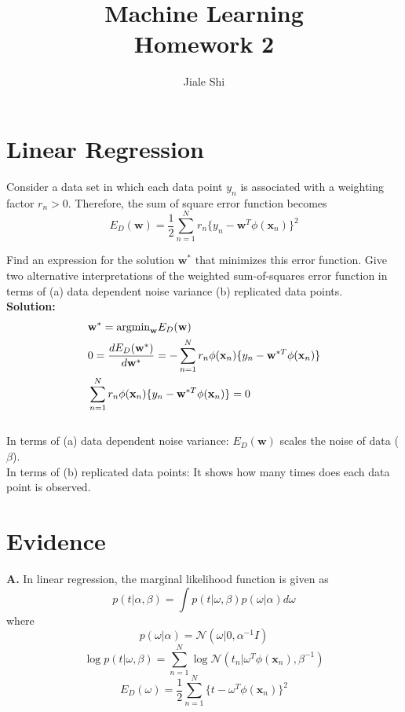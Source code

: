 \documentclass{article}
\title{Machine Learning\\[1em] Homework 2}
\author{Jiale Shi}
\begin{document}
\maketitle

\newpage
\section{Linear Regression}
Consider a data set in which each data point $y_{n}$ is associated with a weighting factor $r_{n}>0$. Therefore, the sum of square error function becomes
\begin{equation}
    E_{D}(\mathbf{w}) = \frac{1}{2} \sum_{n=1}^{N}r_{n}\{y_{n}-\mathbf{w}^{T}\phi(\mathbf{x}_{n})\}^{2}
\end{equation}


Find an expression for the solution $\mathbf{w}^*$ that minimizes this error function. Give two alternative interpretations of the weighted sum-of-squares error function in terms of (a) data dependent noise variance (b) replicated data points.
\\
\textbf{Solution:} \\
\begin{equation}
\begin{aligned}
&  \mathbf{w}^{*}  = {\rm argmin}_{\mathbf{w}}E_{D}(\mathbf{w}) \\
& 0 =  \frac{d E_{D}(\mathbf{w}^{*})}{d \mathbf{w}^{*}}= -\sum_{n=1}^{N}r_{n}\phi(\mathbf{x}_{n})\{y_{n}-\mathbf{w}^{*T}\phi(\mathbf{x}_{n})\} \\
& \sum_{n=1}^{N}r_{n}\phi(\mathbf{x}_{n})\{y_{n}-\mathbf{w}^{*T}\phi(\mathbf{x}_{n})\} = 0
\end{aligned}
\end{equation}
\\
In terms of (a) data dependent noise variance: $E_{D}(\mathbf{w})$ scales the noise of data ($\beta$).
\\
In terms of (b) replicated data points: It shows how many times does each data point is observed.

\newpage
\section{Evidence}
\textbf{A.} In linear regression, the marginal likelihood function is given as 
\begin{equation}
    p(t|\alpha,\beta) = \int p(t|\omega, \beta)p(\omega | \alpha) d\omega
\end{equation}
where
\begin{equation}
    p(\omega | \alpha) = \mathcal{N}(\omega|0,\alpha^{-1} I)
\end{equation}
\begin{equation}
    \log p(t|\omega,\beta) = \sum_{n=1}^{N} \log \mathcal{N}(t_{n}|\omega^{T}\phi(\mathbf{x}_{n}),\beta^{-1})
\end{equation}
\begin{equation}
    E_{D}(\omega) = \frac{1}{2}\sum_{n=1}^{N}\{t -\omega^{T}\phi(\mathbf{x}_{n})\}^{2}
\end{equation}
\end{document}
